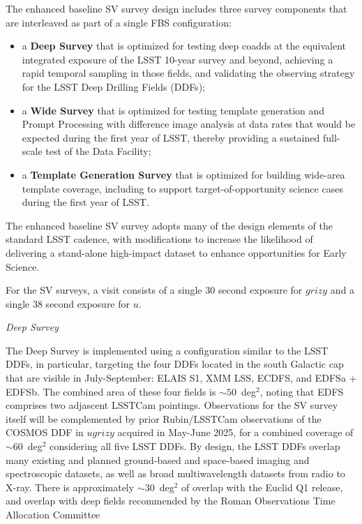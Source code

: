 The enhanced baseline SV survey design includes three survey components that are interleaved as part of a single FBS configuration:
\begin{itemize}
        \item a \textbf{Deep Survey} that is optimized for testing deep coadds at the equivalent integrated exposure of the LSST 10-year survey and beyond, achieving a rapid temporal sampling in those fields, and validating the observing strategy for the LSST Deep Drilling Fields (DDFs);
        \item a \textbf{Wide Survey} that is optimized for testing template generation and Prompt Processing with difference image analysis at data rates that would be expected during the first year of LSST, thereby providing a sustained full-scale test of the Data Facility;
        \item a \textbf{Template Generation Survey} that is optimized for building wide-area template coverage, including to support target-of-opportunity science cases during the first year of LSST.
\end{itemize}
The enhanced baseline SV survey adopts many of the design elements of the standard LSST cadence, with modifications to increase the likelihood of delivering a stand-alone high-impact dataset to enhance opportunities for Early Science.

For the SV surveys, a visit consists of a single 30 second exposure for $grizy$ and a single 38 second exposure for $u$.


\textit{Deep Survey}

The Deep Survey is implemented using a configuration similar to the LSST DDFs, in particular, targeting the four DDFs located in the south Galactic cap that are visible in July-September: ELAIS S1, XMM LSS, ECDFS, and EDFSa + EDFSb.
The combined area of these four fields is $\sim50$~deg$^2$, noting that EDFS comprises two adjascent LSSTCam pointings.
Observations for the SV survey itself will be complemented by prior Rubin/LSSTCam observations of the COSMOS DDF in $ugrizy$ acquired in May-June 2025, for a combined coverage of $\sim60$~deg$^2$ considering all five LSST DDFs.
By design, the LSST DDFs overlap many existing and planned ground-based and space-based imaging and spectroscopic datasets, as well as broad multiwavelength datasets from radio to X-ray.
There is approximately $\sim30$~deg$^2$ of overlap with the Euclid Q1 release, and overlap with deep fields recommended by the Roman Observations Time Allocation Committee

